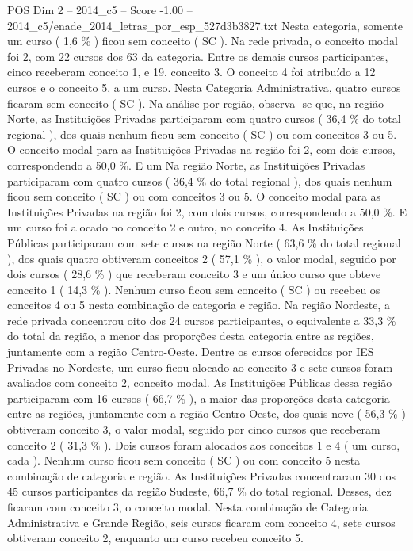 \begin{textsample}{POS Dim 2 – 2014\_c5 – Score -1.00 – 2014\_c5/enade\_2014\_letras\_por\_esp\_527d3b3827.txt}
Nesta categoria, somente um curso ( 1,6 \% ) ficou sem conceito ( SC ).
Na rede privada, o conceito modal foi 2, com 22 cursos dos 63 da categoria.
Entre os demais cursos participantes, cinco receberam conceito 1, e 19, conceito 3.
O conceito 4 foi atribuído a 12 cursos e o conceito 5, a um curso.
Nesta Categoria Administrativa, quatro cursos ficaram sem conceito ( SC ).
Na análise por região, observa -se que, na região Norte, as Instituições Privadas participaram com quatro cursos ( 36,4 \% do total regional ), dos quais nenhum ficou sem conceito ( SC ) ou com conceitos 3 ou 5.
O conceito modal para as Instituições Privadas na região foi 2, com dois cursos, correspondendo a 50,0 \%.
E um Na região Norte, as Instituições Privadas participaram com quatro cursos ( 36,4 \% do total regional ), dos quais nenhum ficou sem conceito ( SC ) ou com conceitos 3 ou 5.
O conceito modal para as Instituições Privadas na região foi 2, com dois cursos, correspondendo a 50,0 \%.
E um curso foi alocado no conceito 2 e outro, no conceito 4.
As Instituições Públicas participaram com sete cursos na região Norte ( 63,6 \% do total regional ), dos quais quatro obtiveram conceitos 2 ( 57,1 \% ), o valor modal, seguido por dois cursos ( 28,6 \% ) que receberam conceito 3 e um único curso que obteve conceito 1 ( 14,3 \% ).
Nenhum curso ficou sem conceito ( SC ) ou recebeu os conceitos 4 ou 5 nesta combinação de categoria e região.
Na região Nordeste, a rede privada concentrou oito dos 24 cursos participantes, o equivalente a 33,3 \% do total da região, a menor das proporções desta categoria entre as regiões, juntamente com a região Centro-Oeste.
Dentre os cursos oferecidos por IES Privadas no Nordeste, um curso ficou alocado ao conceito 3 e sete cursos foram avaliados com conceito 2, conceito modal.
As Instituições Públicas dessa região participaram com 16 cursos ( 66,7 \% ), a maior das proporções desta categoria entre as regiões, juntamente com a região Centro-Oeste, dos quais nove ( 56,3 \% ) obtiveram conceito 3, o valor modal, seguido por cinco cursos que receberam conceito 2 ( 31,3 \% ).
Dois cursos foram alocados aos conceitos 1 e 4 ( um curso, cada ).
Nenhum curso ficou sem conceito ( SC ) ou com conceito 5 nesta combinação de categoria e região.
As Instituições Privadas concentraram 30 dos 45 cursos participantes da região Sudeste, 66,7 \% do total regional.
Desses, dez ficaram com conceito 3, o conceito modal.
Nesta combinação de Categoria Administrativa e Grande Região, seis cursos ficaram com conceito 4, sete cursos obtiveram conceito 2, enquanto um curso recebeu conceito 5.

\end{textsample}
